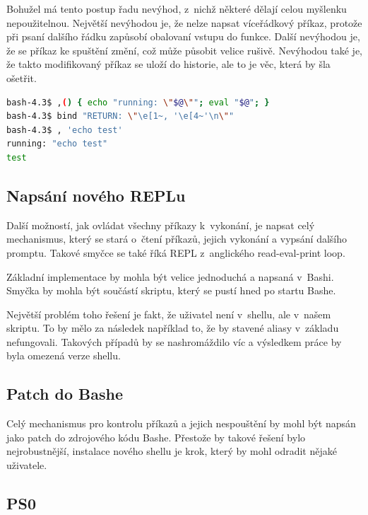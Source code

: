 \documentclass[thesis=M,czech]{FITthesis}[2012/06/26]
\begin{document}
Bohužel má tento postup řadu nevýhod, z~nichž některé dělají celou myšlenku nepoužitelnou. Největší nevýhodou je, že nelze napsat víceřádkový příkaz, protože při psaní dalšího řádku zapůsobí obalovaní vstupu do funkce. Další nevýhodou je, že se příkaz ke spuštění změní, což může působit velice rušivě. Nevýhodou také je, že takto modifikovaný příkaz se uloží do historie, ale to je věc, která by šla ošetřit.

\begin{lstlisting}[language=bash, caption={Modifikace Readline}, label={lst:readline_hack}]
bash-4.3$ ,() { echo "running: \"$@\""; eval "$@"; }
bash-4.3$ bind "RETURN: \"\e[1~, '\e[4~'\n\""
bash-4.3$ , 'echo test'
running: "echo test"
test
\end{lstlisting}

%
%
\subsection{Napsání nového REPLu}

Další možností, jak ovládat všechny příkazy k~vykonání, je napsat celý mechanismus, který se stará o~čtení příkazů, jejich vykonání a vypsání dalšího promptu. Takové smyčce se také říká REPL z~anglického read-eval-print loop.

Základní implementace by mohla být velice jednoduchá a napsaná v~Bashi. Smyčka by mohla být součástí skriptu, který se pustí hned po startu Bashe.

Největší problém toho řešení je fakt, že uživatel není v~shellu, ale v~našem skriptu. To by mělo za následek například to, že by stavené aliasy v~základu nefungovali. Takových případů by se nashromáždilo víc a výsledkem práce by byla omezená verze shellu.


%
%
\subsection{Patch do Bashe}

Celý mechanismus pro kontrolu příkazů a jejich nespouštění by mohl být napsán jako patch do zdrojového kódu Bashe. Přestože by takové řešení bylo nejrobustnější, instalace nového shellu je krok, který by mohl odradit nějaké uživatele.

%
\subsection{PS0}
\end{document}
